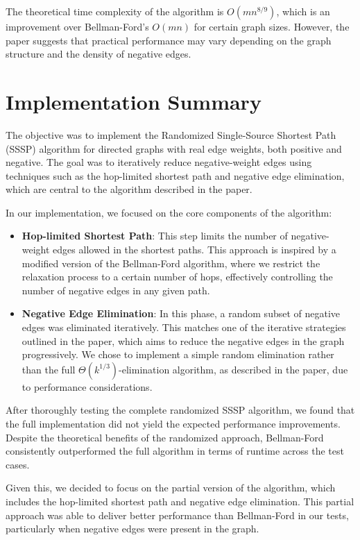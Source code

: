 \documentclass[12pt]{article}
\begin{document}
The theoretical time complexity of the algorithm is $O(m n^{8/9})$, which is an improvement over Bellman-Ford’s $O(mn)$ for certain graph sizes. However, the paper suggests that practical performance may vary depending on the graph structure and the density of negative edges.

\section{Implementation Summary}

The objective was to implement the Randomized Single-Source Shortest Path (SSSP) algorithm for directed graphs with real edge weights, both positive and negative. The goal was to iteratively reduce negative-weight edges using techniques such as the hop-limited shortest path and negative edge elimination, which are central to the algorithm described in the paper.

In our implementation, we focused on the core components of the algorithm:

\begin{itemize}
    \item \textbf{Hop-limited Shortest Path}: This step limits the number of negative-weight edges allowed in the shortest paths. This approach is inspired by a modified version of the Bellman-Ford algorithm, where we restrict the relaxation process to a certain number of hops, effectively controlling the number of negative edges in any given path.
    \item \textbf{Negative Edge Elimination}: In this phase, a random subset of negative edges was eliminated iteratively. This matches one of the iterative strategies outlined in the paper, which aims to reduce the negative edges in the graph progressively. We chose to implement a simple random elimination rather than the full $\Theta(k^{1/3})$-elimination algorithm, as described in the paper, due to performance considerations.
\end{itemize}

After thoroughly testing the complete randomized SSSP algorithm, we found that the full implementation did not yield the expected performance improvements. Despite the theoretical benefits of the randomized approach, Bellman-Ford consistently outperformed the full algorithm in terms of runtime across the test cases. 

Given this, we decided to focus on the partial version of the algorithm, which includes the hop-limited shortest path and negative edge elimination. This partial approach was able to deliver better performance than Bellman-Ford in our tests, particularly when negative edges were present in the graph. 
\end{document}
